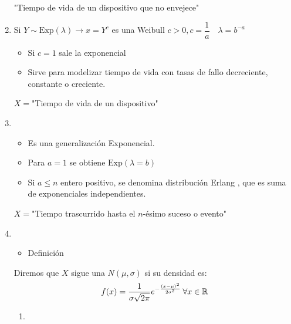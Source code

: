 \begin{enumerate}[label=\textbf{\color{red}\Alph*)}, leftmargin=*]
		"Tiempo de vida de un dispositivo que no envejece"
		\item {}
		
		Si $Y\sim\mathrm{Exp}(\lambda)\longrightarrow x=Y^c$ es una Weibull $c>0,c=\dfrac{1}{a}\quad\lambda=b^{-a}$
		\begin{itemize}
			\item Si $c=1$ sale la exponencial
			\item Sirve para modelizar tiempo de vida con tasas de fallo decreciente, constante o creciente.
		\end{itemize}
		$X=$"Tiempo de vida de un dispositivo"
		\item {}
		\begin{itemize}
			\item Es una generalización Exponencial.
			\item Para $a=1$ se obtiene $\mathrm{Exp}(\lambda =b)$
			\item Si $a\le n$ entero positivo, se denomina distribución Erlang , que es suma de exponenciales independientes.
		\end{itemize}
		$X=$"Tiempo trascurrido hasta el $n$-ésimo suceso o evento"
		\item {}
		\begin{itemize}[label=\color{red}\textbullet, leftmargin=*]
			\item \color{lightblue}Definición
		\end{itemize}
		Diremos que $X$ sigue una $N(\mu,\sigma)$ si su densidad es: \[ f(x)=\dfrac{1}{\sigma\sqrt{2\pi}}e^{-\frac{(x-\mu)^2}{2\sigma^2}}\:\forall x\in\operatorname{\mathbb{R}} \]
		\begin{enumerate}[label=\color{red}\alph*)]
			\item {}
			

\end{enumerate}
\end{enumerate}
